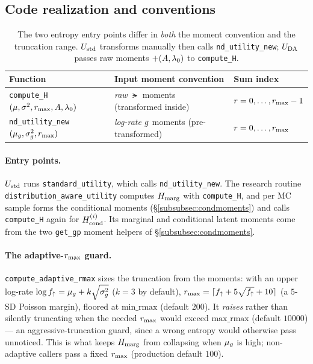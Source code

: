 \subsection{Code realization and conventions}
\label{subsec:code}

\begin{table}[t]
  \centering
  \footnotesize
  \begin{tabular}{@{}lll@{}}
    \toprule
    Function & Input moment convention & Sum index\\
    \midrule
    \texttt{compute\_H}$(\mu,\sigma^{2},r_{\max},A,\lambda_{0})$ & \emph{raw} $\lat$ moments (transformed inside) & $r=0,\dots,r_{\max}-1$\\
    \texttt{nd\_utility\_new}$(\mu_{g},\sigma_{g}^{2},r_{\max})$ & \emph{log-rate} $g$ moments (pre-transformed) & $r=0,\dots,r_{\max}$\\
    \bottomrule
  \end{tabular}
  \caption{The two entropy entry points differ in \emph{both} the moment
  convention and the truncation range. $U_{\mathrm{std}}$ transforms manually then calls
  \texttt{nd\_utility\_new}; $U_{\mathrm{DA}}$ passes raw moments $+(A,\lambda_{0})$ to
  \texttt{compute\_H}.}
  \label{tab:code-conventions}
\end{table}

\paragraph{Entry points.} $U_{\mathrm{std}}$ runs \texttt{standard\_utility}, which calls
\texttt{nd\_utility\_new}. The research routine
\texttt{distribution\_\allowbreak aware\_\allowbreak utility} computes $H_{\mathrm{marg}}$
with \texttt{compute\_H}, and per MC sample forms the conditional moments
(\S\ref{subsubsec:condmoments}) and calls \texttt{compute\_H} again for
$H_{\mathrm{cond}}^{(i)}$. Its marginal and conditional latent moments come from the two
\texttt{get\_gp} moment helpers of \S\ref{subsubsec:condmoments}.

\paragraph{The adaptive-$r_{\max}$ guard.} \texttt{compute\_adaptive\_rmax} sizes the
truncation from the moments: with an upper log-rate
$\log f_{\uparrow}=\mu_{g}+k\sqrt{\sigma_{g}^{2}}$ ($k=3$ by default),
$r_{\max}=\lceil f_{\uparrow}+5\sqrt{f_{\uparrow}}+10\rceil$ (a $5$-SD Poisson
margin), floored at $\text{min\_rmax}$ (default $200$). It \emph{raises} rather
than silently truncating when the needed $r_{\max}$ would exceed
$\text{max\_rmax}$ (default $10000$) --- an aggressive-truncation guard, since a
wrong entropy would otherwise pass unnoticed. This is what keeps $H_{\mathrm{marg}}$ from
collapsing when $\mu_{g}$ is high; non-adaptive callers pass a fixed $r_{\max}$
(production default $100$).

